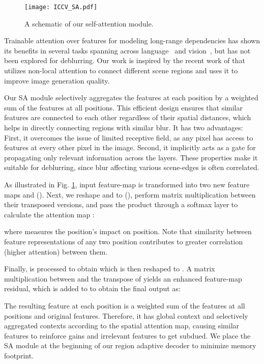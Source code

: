 \documentclass[letterpaper]{article} \usepackage{aaai20}  \usepackage{times}  \usepackage{helvet} \usepackage{courier}  \usepackage[hyphens]{url}  \usepackage{graphicx} \urlstyle{rm} \def\UrlFont{\rm}  \usepackage{graphicx}  \frenchspacing  \setlength{\pdfpagewidth}{8.5in}  \setlength{\pdfpageheight}{11in}
\begin{document}
\begin{figure}[]
\centering
\texttt{[image: ICCV\_SA.pdf]}
\caption{A schematic of our self-attention module.}
\label{fig:attentionblock}
\end{figure}

Trainable attention over features for modeling long-range dependencies has shown its benefits in several tasks spanning across language~\cite{shen2018disan,vaswani2017attention} and vision~\cite{wang2018non}, but has not been explored for deblurring. Our work is inspired by the recent work of \cite{zhang2018self} that utilizes non-local attention to connect different scene regions and uses it to improve image generation quality. 

 Our SA module selectively aggregates the features at each position by a weighted sum of the features at all positions. This efficient design ensures that similar features are connected to each other regardless of their spatial distances, which helps in directly connecting regions with similar blur. It has two advantages: First, it overcomes the issue of limited receptive field, as any pixel has access to features at every other pixel in the image. Second, it implicitly acts as a gate for propagating only relevant information across the layers. These properties make it suitable for deblurring, since blur affecting various scene-edges is often correlated.

As illustrated in Fig. \ref{fig:attentionblock}, input feature-map  is transformed into two new feature maps  and   ().  Next, we reshape  and   to  (), perform matrix multiplication between their transposed versions, and pass the product through a softmax layer to calculate the attention map :

where  measures the  position's impact on  position. Note that similarity between feature representations of any two position contributes to greater correlation (higher attention) between them. 

Finally,  is processed to obtain  which is then reshaped to . A matrix multiplication between  and the transpose of  yields an enhanced feature-map residual, which is added to  to obtain the final output  as:



The resulting feature   at each position is a weighted sum of the features at all positions and original features. Therefore, it has global context and selectively aggregated contexts according to the spatial attention map, causing similar features to reinforce gains and irrelevant features to get subdued. We place the SA module at the beginning of our region adaptive decoder to minimize memory footprint.
\end{document}
